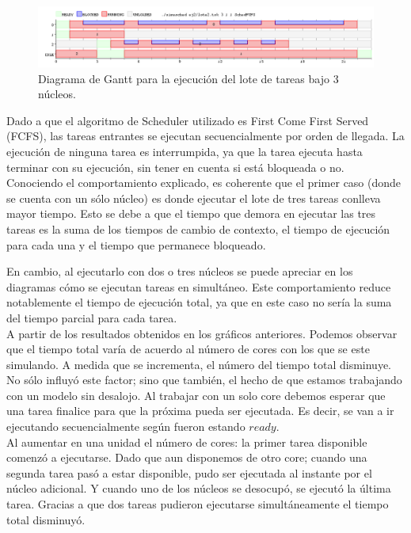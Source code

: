 \documentclass[a4paper]{article}
\begin{document}
  \newpage

  \begin{figure}[h!]
   \begin{center}
 	\includegraphics[scale=0.5]{imagenes/ej2/3core.png}
 	\caption{Diagrama de Gantt para la ejecuci\'on del lote de tareas bajo 3 n\'ucleos.}
   \end{center}
 \end{figure} 

 
 Dado a que el algoritmo de Scheduler utilizado es First Come First Served (FCFS), las tareas entrantes se ejecutan secuencialmente por orden de llegada. La ejecuci\'on de ninguna tarea es interrumpida, ya que la tarea ejecuta hasta terminar con su ejecuci\'on, sin tener en cuenta si est\'a bloqueada o no.\\

Conociendo el comportamiento explicado, es coherente que el primer caso (donde se cuenta con un s\'olo n\'ucleo) es donde ejecutar el lote de tres tareas conlleva mayor tiempo. Esto se debe a que el tiempo que demora en ejecutar las tres tareas es la suma de los tiempos de cambio de contexto, el tiempo de ejecuci\'on para cada una y el tiempo que permanece bloqueado.

En cambio, al ejecutarlo con dos o tres n\'ucleos se puede apreciar en los diagramas c\'omo se ejecutan tareas en simult\'aneo. Este comportamiento reduce notablemente el tiempo de ejecuci\'on total, ya que en este caso no ser\'ia la suma del tiempo parcial para cada tarea.\\

A partir de los resultados obtenidos en los gráficos anteriores. Podemos observar que el tiempo total varía de acuerdo al número de cores con los que se este simulando. A medida que se incrementa, el número del tiempo total disminuye. No s\'olo influyó este factor; sino que también, el hecho de que estamos trabajando con un modelo sin desalojo.  
Al trabajar con un solo core debemos esperar que una tarea finalice para que la próxima pueda ser ejecutada. Es decir, se van a ir ejecutando secuencialmente según fueron estando $ready$. \\

Al aumentar en una unidad el número de cores: la primer tarea disponible comenzó a ejecutarse. Dado que aun disponemos de otro core; cuando una segunda tarea pas\'o a estar disponible, pudo ser ejecutada al instante por el núcleo adicional. Y cuando uno de los n\'ucleos se desocupó, se ejecutó la última tarea. Gracias a que dos tareas pudieron ejecutarse simult\'aneamente el tiempo total disminuyó. 
\end{document}
